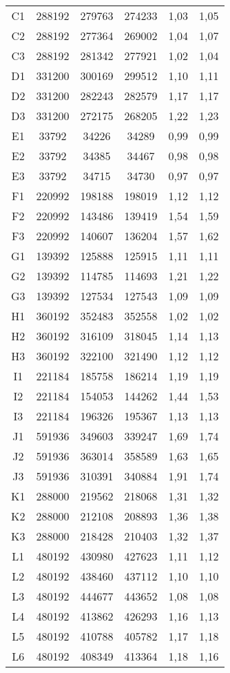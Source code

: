 \begin{center}
\begin{longtable}{cccccc}
    C1    & 288192 & 279763 & 274233 & 1,03  & 1,05 \\
    C2    & 288192 & 277364 & 269002 & 1,04  & 1,07 \\
    C3    & 288192 & 281342 & 277921 & 1,02  & 1,04 \\
    D1    & 331200 & 300169 & 299512 & 1,10  & 1,11 \\
    D2    & 331200 & 282243 & 282579 & 1,17  & 1,17 \\
    D3    & 331200 & 272175 & 268205 & 1,22  & 1,23 \\
    E1    & 33792 & 34226 & 34289 & 0,99  & 0,99 \\
    E2    & 33792 & 34385 & 34467 & 0,98  & 0,98 \\
    E3    & 33792 & 34715 & 34730 & 0,97  & 0,97 \\
    F1    & 220992 & 198188 & 198019 & 1,12  & 1,12 \\
    F2    & 220992 & 143486 & 139419 & 1,54  & 1,59 \\
    F3    & 220992 & 140607 & 136204 & 1,57  & 1,62 \\
    G1    & 139392 & 125888 & 125915 & 1,11  & 1,11 \\
    G2    & 139392 & 114785 & 114693 & 1,21  & 1,22 \\
    G3    & 139392 & 127534 & 127543 & 1,09  & 1,09 \\
    H1    & 360192 & 352483 & 352558 & 1,02  & 1,02 \\
    H2    & 360192 & 316109 & 318045 & 1,14  & 1,13 \\
    H3    & 360192 & 322100 & 321490 & 1,12  & 1,12 \\
    I1    & 221184 & 185758 & 186214 & 1,19  & 1,19 \\
    I2    & 221184 & 154053 & 144262 & 1,44  & 1,53 \\
    I3    & 221184 & 196326 & 195367 & 1,13  & 1,13 \\
    J1    & 591936 & 349603 & 339247 & 1,69  & 1,74 \\
    J2    & 591936 & 363014 & 358589 & 1,63  & 1,65 \\
    J3    & 591936 & 310391 & 340884 & 1,91  & 1,74 \\
    K1    & 288000 & 219562 & 218068 & 1,31  & 1,32 \\
    K2    & 288000 & 212108 & 208893 & 1,36  & 1,38 \\
    K3    & 288000 & 218428 & 210403 & 1,32  & 1,37 \\
    L1    & 480192 & 430980 & 427623 & 1,11  & 1,12 \\
    L2    & 480192 & 438460 & 437112 & 1,10  & 1,10 \\
    L3    & 480192 & 444677 & 443652 & 1,08  & 1,08 \\
    L4    & 480192 & 413862 & 426293 & 1,16  & 1,13 \\
    L5    & 480192 & 410788 & 405782 & 1,17  & 1,18 \\
    L6    & 480192 & 408349 & 413364 & 1,18  & 1,16 \\
\end{longtable}
\end{center}


